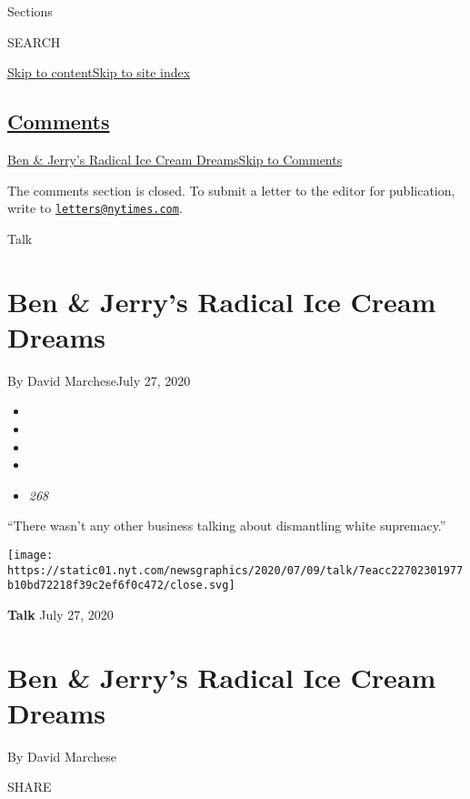 Sections

SEARCH

\protect\hyperlink{site-content}{Skip to
content}\protect\hyperlink{site-index}{Skip to site index}

\hypertarget{comments}{%
\subsection{\texorpdfstring{\protect\hyperlink{commentsContainer}{Comments}}{Comments}}\label{comments}}

\href{}{Ben \& Jerry's Radical Ice Cream Dreams}\href{}{Skip to
Comments}

The comments section is closed. To submit a letter to the editor for
publication, write to
\href{mailto:letters@nytimes.com}{\nolinkurl{letters@nytimes.com}}.

Talk

\hypertarget{ben--jerrys-radical-ice-cream-dreams}{%
\section{Ben \& Jerry's Radical Ice Cream
Dreams}\label{ben--jerrys-radical-ice-cream-dreams}}

By David MarcheseJuly 27, 2020

\begin{itemize}
\item
\item
\item
\item
\item
  \emph{268}
\end{itemize}

``There wasn't any other business talking about dismantling white
supremacy.''

\texttt{[image: https://static01.nyt.com/newsgraphics/2020/07/09/talk/7eacc22702301977b10bd72218f39c2ef6f0c472/close.svg]}

\textbf{Talk} July 27, 2020

\hypertarget{ben--jerrys-radical-ice-cream-dreams-1}{%
\section{Ben \& Jerry's Radical Ice Cream
Dreams}\label{ben--jerrys-radical-ice-cream-dreams-1}}

By David Marchese

SHARE

